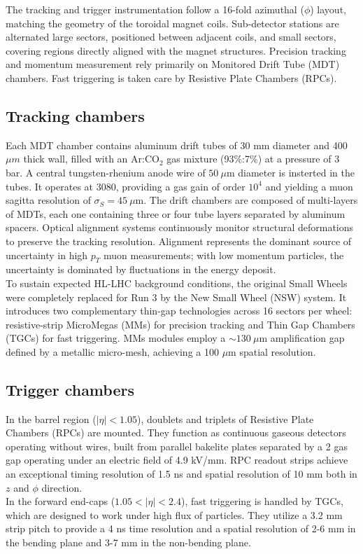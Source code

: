 \noindent The tracking and trigger instrumentation follow a 16-fold azimuthal ($\phi$) layout, matching the geometry of the toroidal magnet coils. 
Sub-detector stations are alternated large sectors, positioned between adjacent coils, and small sectors, covering regions directly aligned with the magnet structures.
Precision tracking and momentum measurement rely primarily on Monitored Drift Tube (MDT) chambers. Fast triggering is taken care by Resistive Plate Chambers (RPCs).

\subsection*{Tracking chambers}\label{sec:sec:LHCAtlas/ATLAS/Muon/MDT}

Each MDT chamber contains aluminum drift tubes of 30 mm diameter and 400 $\mu m$ thick wall, filled with an $\text{Ar:CO}_2$ gas mixture (93\%:7\%) at a pressure of 3 bar. 
A central tungsten-rhenium anode wire of $50\ \mu\text{m}$ diameter is insterted in the tubes. It operates at 3080, providing a gas gain of order $ 10^4$ and yielding a muon sagitta resolution of $\sigma_S = 45\ \mu\text{m}$. 
The drift chambers are composed of multi-layers of MDTs, each one containing three or four tube layers separated by aluminum spacers. 
Optical alignment systems continuously monitor structural deformations to preserve the tracking resolution.
Alignment represents the dominant source of uncertainty in high $p_T$ muon measurements; with low momentum particles, the uncertainty is dominated by fluctuations in the energy deposit.\\
To sustain expected HL-LHC background conditions, the original Small Wheels were completely replaced for Run 3 by the New Small Wheel (NSW) system.
It introduces two complementary thin-gap technologies across 16 sectors per wheel: resistive-strip MicroMegas (MMs) for precision tracking and Thin Gap Chambers (TGCs) for fast triggering.
MMs modules employ a $\sim 130\ \mu\text{m}$ amplification gap defined by a metallic micro-mesh, achieving a 100 $\mu\text{m}$ spatial resolution. 

\subsection*{Trigger chambers}\label{sec:sec:LHCAtlas/ATLAS/Muon/RPCs}

In the barrel region ($|\eta| < 1.05$), doublets and triplets of Resistive Plate Chambers (RPCs) are mounted. 
They function as continuous gaseous detectors operating without wires, built from parallel bakelite plates separated by a 2 gas gap operating under an electric field of 4.9 kV/mm. 
RPC readout strips achieve an exceptional timing resolution of 1.5 ns and spatial resolution of 10 mm both in $z$ and $\phi$ direction.\\ 
In the forward end-caps ($1.05 < |\eta| < 2.4$), fast triggering is handled by TGCs, which are designed to work under high flux of particles. 
They utilize a 3.2 mm strip pitch to provide a 4 ns time resolution and a spatial resolution of 2-6 mm in the bending plane and 3-7 mm in the non-bending plane.


